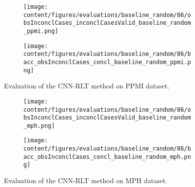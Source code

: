 \begin{figure}[t]
  \begin{subfigure}{0.9\textwidth}
    \centering
    \texttt{[image: content/figures/evaluations/baseline\_random/86/obsInconclCases\_inconclCasesValid\_baseline\_random\_ppmi.png]}
    \label{fig:obsInconclCases_inconclCasesValid_baseline_random_ppmi}
  \end{subfigure}
  \hfill
  \begin{subfigure}{0.9\textwidth}
    \centering
    \texttt{[image: content/figures/evaluations/baseline\_random/86/bacc\_obsInconclCases\_concl\_baseline\_random\_ppmi.png]}
    \label{fig:bacc_obsInconclCases_concl_baseline_random_ppmi}
  \end{subfigure}
  \caption{Evaluation of the CNN-RLT method on PPMI dataset.}
\end{figure}





\begin{figure}[t]
  \begin{subfigure}{0.9\textwidth}
    \centering
    \texttt{[image: content/figures/evaluations/baseline\_random/86/obsInconclCases\_inconclCasesValid\_baseline\_random\_mph.png]}
    \label{fig:obsInconclCases_inconclCasesValid_baseline_random_mph}
  \end{subfigure}
  \hfill
  \begin{subfigure}{0.9\textwidth}
    \centering
    \texttt{[image: content/figures/evaluations/baseline\_random/86/bacc\_obsInconclCases\_concl\_baseline\_random\_mph.png]}
    \label{fig:bacc_obsInconclCases_concl_baseline_random_mph}
  \end{subfigure}
  \caption{Evaluation of the CNN-RLT method on MPH dataset.}
\end{figure}


